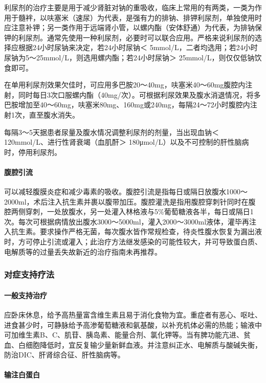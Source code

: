 利尿剂的治疗主要是用于减少肾脏对钠的重吸收，临床上常用的有两类，一类为作用于髓袢，以呋塞米（速尿）为代表，是强有力的排钠、排钾利尿剂，单独使用时应注意补钾；另一类作用于远端肾小管，以螺内酯（安体舒通）为代表，为排钠保钾的利尿剂。通常先使用一种利尿剂，必要时可以联合应用。严格来说利尿剂的选择应根据24小时尿钠来决定，若24小时尿钠＜
5mmol/L，二者均选用；若24小时尿钠为5～25mmol/L，则选用螺内酯；若24小时尿钠＞
25mmol/L，则仅仅低钠饮食即可。

在单用利尿剂效果欠佳时，可应用多巴胺20～40mg，呋塞米40～60mg腹腔内注射，同时每日3次口服螺内酯（40mg/次）。可根据利尿效果及腹水消退情况，将多巴胺增加至40～60mg，呋塞米80mg、160mg或240mg，每隔24～72小时腹腔内注射1次，直至腹水消失。

每隔3～5天据患者尿量及腹水情况调整利尿剂的剂量，当出现血钠＜
120mmol/L、进行性肾衰竭（血肌酐＞
180μmol/L）以及不可控制的肝性脑病时，停用利尿剂。

\paragraph{腹腔引流}

可以减轻腹膜炎症和减少毒素的吸收。腹腔引流是指每日或隔日放腹水1000～2000ml，术后注入抗生素并裹以腹带加压。腹腔灌洗是指用腹腔穿刺针同时在腹腔两侧穿刺，一处放腹水，另一处灌入林格液与5\%葡萄糖液各半，每日或隔日1次。每次可根据病情放出腹水3000～5000ml，灌入2000～3000ml液体，灌毕再注入抗生素。要求操作严格无菌，每次腹水皆作常规检查，待炎性腹水恢复为漏出液时，方可停止引流或灌入；此治疗方法继发感染的可能性较大，并可导致蛋白质、电解质等的过量丢失故新近的治疗指南未再推荐。

\subsubsection{对症支持疗法}

\paragraph{一般支持治疗}

应卧床休息，给予高热量富含维生素且易于消化食物为宜。重症者有恶心、呕吐、进食甚少时，可静脉给予高渗葡萄糖液和氨基酸，以补充机体必需的热能；输液中可加维生素B、C、肌苷、胰岛素、能量合剂、氯化钾等。当有脾功能亢进、贫血、白细胞降低时，宜反复输少量新鲜血液。并注意纠正水、电解质与酸碱失衡，防治DIC、肝肾综合征、肝性脑病等。

\paragraph{输注白蛋白}

